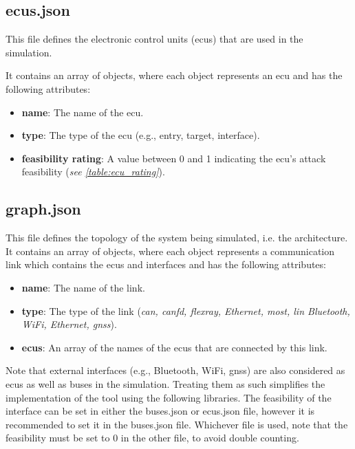 \subsection{ecus.json}
\label{sec:\gls{ecu}s}

This file defines the electronic control units (\gls{ecu}s) that are used in the simulation. 

It contains an array of objects, where each object represents an \gls{ecu} and has the following attributes:

\begin{itemize}
\item \textbf{name}: The name of the \gls{ecu}.
\item \textbf{type}: The type of the \gls{ecu} (e.g., entry, target, interface).
\item \textbf{feasibility rating}: A value between 0 and 1 indicating the \gls{ecu}'s attack feasibility (\textit{see \ref{table:ecu_rating}}).
\end{itemize}

\subsection{graph.json}
\label{sec:graph}

This file defines the topology of the system being simulated, i.e. the architecture. 
It contains an array of objects, where each object represents a communication link which contains the \gls{ecu}s and interfaces and has the following attributes:

\begin{itemize}
\item \textbf{name}: The name of the link.
\item \textbf{type}: The type of the link (\textit{\gls{can}, \gls{canfd}, \gls{flexray}, Ethernet, \gls{most}, \gls{lin} Bluetooth, WiFi, Ethernet, \gls{gnss}}).
\item \textbf{\gls{ecu}s}: An array of the names of the \gls{ecu}s that are connected by this link.
\end{itemize}

Note that external interfaces (e.g., Bluetooth, WiFi, \gls{gnss}) are also considered as \gls{ecu}s as well as buses in the simulation.
Treating them as such simplifies the implementation of the tool using the following libraries.
The feasibility of the interface can be set in either the buses.json or ecus.json file, however it is recommended to set it in the buses.json file.
Whichever file is used, note that the feasibility must be set to 0 in the other file, to avoid double counting.


